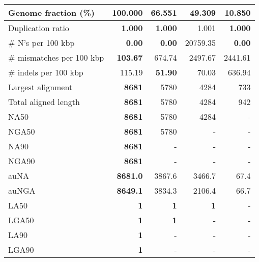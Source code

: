 \documentclass[12pt,a4paper]{article}
\begin{document}
\begin{table}[ht]
\begin{center}
\begin{tabular}{|l*{4}{|r}|}
Genome fraction (\%) & {\bf 100.000} & 66.551 & 49.309 & 10.850 \\ \hline
Duplication ratio & {\bf 1.000} & {\bf 1.000} & 1.001 & {\bf 1.000} \\ \hline
\# N's per 100 kbp & {\bf 0.00} & {\bf 0.00} & 20759.35 & {\bf 0.00} \\ \hline
\# mismatches per 100 kbp & {\bf 103.67} & 674.74 & 2497.67 & 2441.61 \\ \hline
\# indels per 100 kbp & 115.19 & {\bf 51.90} & 70.03 & 636.94 \\ \hline
Largest alignment & {\bf 8681} & 5780 & 4284 & 733 \\ \hline
Total aligned length & {\bf 8681} & 5780 & 4284 & 942 \\ \hline
NA50 & {\bf 8681} & 5780 & 4284 & - \\ \hline
NGA50 & {\bf 8681} & 5780 & - & - \\ \hline
NA90 & {\bf 8681} & - & - & - \\ \hline
NGA90 & {\bf 8681} & - & - & - \\ \hline
auNA & {\bf 8681.0} & 3867.6 & 3466.7 & 67.4 \\ \hline
auNGA & {\bf 8649.1} & 3834.3 & 2106.4 & 66.7 \\ \hline
LA50 & {\bf 1} & {\bf 1} & {\bf 1} & - \\ \hline
LGA50 & {\bf 1} & {\bf 1} & - & - \\ \hline
LA90 & {\bf 1} & - & - & - \\ \hline
LGA90 & {\bf 1} & - & - & - \\ \hline
\end{tabular}
\end{center}
\end{table}
\end{document}
